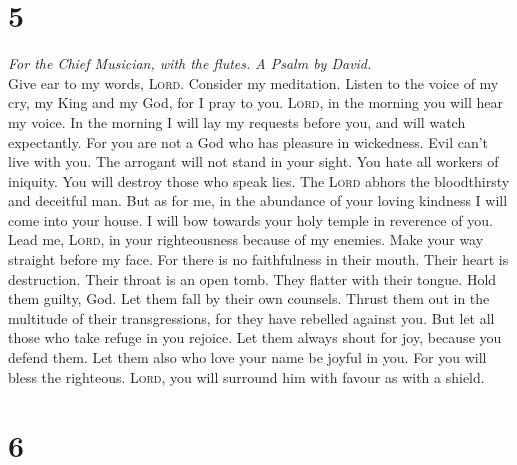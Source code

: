 \hypertarget{section-4}{%
\section{5}\label{section-4}}

\emph{For the Chief Musician, with the flutes. A Psalm by David.}\\
 Give ear to my words, \textsc{Lord}. Consider my
meditation.  Listen to the voice of my cry, my King and my
God, for I pray to you.  \textsc{Lord}, in the morning you
will hear my voice. In the morning I will lay my requests before you,
and will watch expectantly.  For you are not a God who has
pleasure in wickedness. Evil can't live with you.  The
arrogant will not stand in your sight. You hate all workers of iniquity.
 You will destroy those who speak lies. The \textsc{Lord}
abhors the bloodthirsty and deceitful man.  But as for me,
in the abundance of your loving kindness I will come into your house. I
will bow towards your holy temple in reverence of you. 
Lead me, \textsc{Lord}, in your righteousness because of my enemies.
Make your way straight before my face.  For there is no
faithfulness in their mouth. Their heart is destruction. Their throat is
an open tomb. They flatter with their tongue.  Hold them
guilty, God. Let them fall by their own counsels. Thrust them out in the
multitude of their transgressions, for they have rebelled against you.
 But let all those who take refuge in you rejoice. Let
them always shout for joy, because you defend them. Let them also who
love your name be joyful in you.  For you will bless the
righteous. \textsc{Lord}, you will surround him with favour as with a
shield.

\hypertarget{section-5}{%
\section{6}\label{section-5}}

